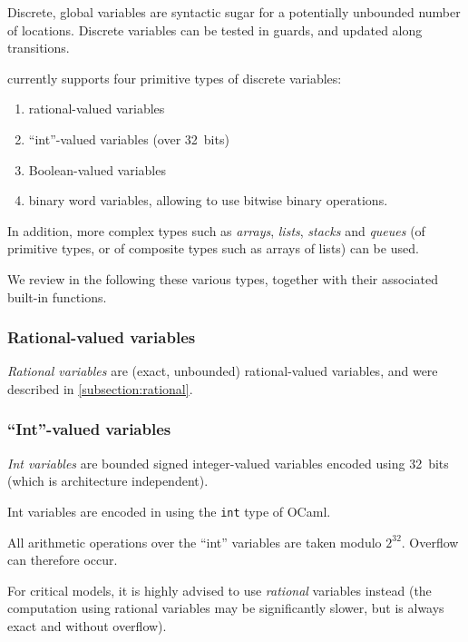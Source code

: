 Discrete, global variables are syntactic sugar for a potentially unbounded number of locations.
Discrete variables can be tested in guards, and updated along transitions.

\imitator{} currently supports four primitive types of discrete variables:
\begin{enumerate}
	\item rational-valued variables
	\item ``int''-valued variables (over 32~bits)
	\item Boolean-valued variables
	\item binary word variables, allowing to use bitwise binary operations.
\end{enumerate}

In addition, more complex types such as \emph{arrays}, \emph{lists}, \emph{stacks} and \emph{queues} (of primitive types, or of composite types such as arrays of lists) can be used.

We review in the following these various types, together with their associated built-in functions.


\subsubsection{Rational-valued variables}

\emph{Rational variables} are (exact, unbounded) rational-valued variables, and were described in \cref{subsection:rational}.

\subsubsection{``Int''-valued variables}

\emph{Int variables} are bounded signed integer-valued variables encoded using 32~bits (which is architecture independent).

Int variables are encoded in \imitator{} using the \texttt{int} type of OCaml.

\begin{becareful}
	All arithmetic operations over the ``int'' variables are taken modulo $2^{32}$.
	Overflow can therefore occur.

	For critical models, it is highly advised to use \emph{rational} variables instead (the computation using rational variables may be significantly slower, but is always exact and without overflow).
\end{becareful}

